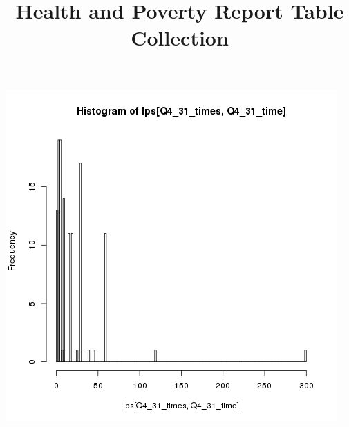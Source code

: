 \documentclass[]{article}
\title{Health and Poverty Report Table Collection}
\author{}
\begin{document}
\maketitle 












\includegraphics[width=0.7\linewidth]{Q4_31_waittimes}











\end{document}

